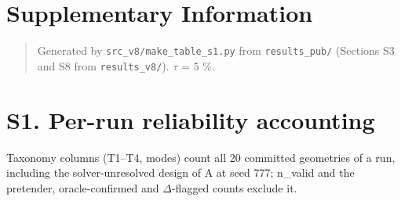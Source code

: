 \documentclass[11pt,a4paper]{article}
\begin{document}
\clearpage
\setcounter{table}{0}\setcounter{figure}{0}
\renewcommand{\thetable}{S\arabic{table}}\renewcommand{\thefigure}{S\arabic{figure}}
\begin{landscape}
\section*{Supplementary Information}

\begin{quote}
Generated by \texttt{src\_\allowbreak{}v8/\allowbreak{}make\_\allowbreak{}table\_\allowbreak{}s1.\allowbreak{}py} from \texttt{results\_pub/} (Sections S3 and S8 from \texttt{results\_v8/}). \ensuremath{\tau} = 5 \%.
\end{quote}

\section*{S1. Per-run reliability accounting}

Taxonomy columns (T1--T4, modes) count all 20 committed geometries of a run, including the solver-unresolved design of A at seed 777; n\_valid and the pretender, oracle-confirmed and \ensuremath{\Delta}-flagged counts exclude it.



\end{landscape}
\end{document}
